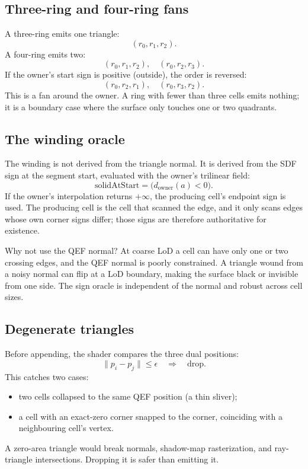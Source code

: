 \subsection{Three-ring and four-ring fans}

A three-ring emits one triangle:
\begin{equation}
  (r_0,r_1,r_2).
\end{equation}
A four-ring emits two:
\begin{equation}
  (r_0,r_1,r_2), \quad (r_0,r_2,r_3).
\end{equation}
If the owner's start sign is positive (outside), the order is reversed:
\begin{equation}
  (r_0,r_2,r_1), \quad (r_0,r_3,r_2).
\end{equation}
This is a fan around the owner.  A ring with fewer than three cells emits
nothing; it is a boundary case where the surface only touches one or two
quadrants.

\subsection{The winding oracle}

The winding is not derived from the triangle normal.  It is derived from
the SDF sign at the segment start, evaluated with the owner's trilinear
field:
\begin{equation}
  \text{solidAtStart} = \bigl(d_{\text{owner}}(a) < 0\bigr).
\end{equation}
If the owner's interpolation returns $+\infty$, the producing cell's
endpoint sign is used.  The producing cell is the cell that scanned the
edge, and it only scans edges whose own corner signs differ; those signs
are therefore authoritative for existence.

Why not use the QEF normal?  At coarse LoD a cell can have only one or two
crossing edges, and the QEF normal is poorly constrained.  A triangle
wound from a noisy normal can flip at a LoD boundary, making the surface
black or invisible from one side.  The sign oracle is independent of the
normal and robust across cell sizes.

\subsection{Degenerate triangles}

Before appending, the shader compares the three dual positions:
\begin{equation}
  \|p_i-p_j\| \le \epsilon \quad\Rightarrow\quad \text{drop}.
\end{equation}
This catches two cases:
\begin{itemize}
\item two cells collapsed to the same QEF position (a thin sliver);
\item a cell with an exact-zero corner snapped to the corner, coinciding
  with a neighbouring cell's vertex.
\end{itemize}
A zero-area triangle would break normals, shadow-map rasterization, and
ray-triangle intersections.  Dropping it is safer than emitting it.

